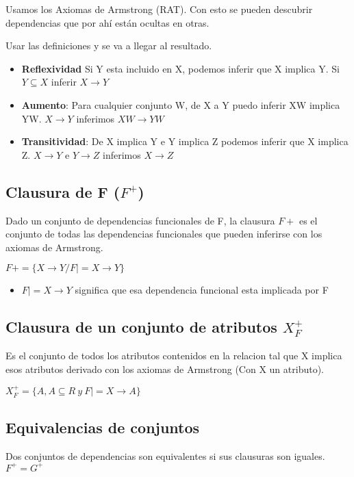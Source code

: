 Usamos los Axiomas de Armstrong (RAT). Con esto se pueden descubrir dependencias que por ahí están ocultas en otras.

\medskip
Usar las definiciones y se va a llegar al resultado.

\begin{itemize}
\item \textbf{Reflexividad} Si Y esta incluido en X, podemos inferir que X implica Y. Si $Y \subseteq X$ inferir $X\rightarrow Y$
\item \textbf{Aumento}: Para cualquier conjunto W, de X a Y puedo inferir XW implica YW. $X\rightarrow Y$ inferimos $XW\rightarrow YW$
\item \textbf{Transitividad}: De X implica Y e Y implica Z podemos inferir que X implica Z. $X\rightarrow Y$ e $Y\rightarrow Z$ inferimos $X\rightarrow Z$
\end{itemize}

\subsection*{Clausura de F ($F^+$)}
Dado un conjunto de dependencias funcionales de F, la clausura $F+$ es el conjunto de todas las dependencias funcionales que pueden inferirse con los axiomas de Armstrong.

\begin{center}
    $F+ = \{X\rightarrow Y / F|=X\rightarrow Y\}$
\end{center}

\begin{itemize}
\item $F|=X\rightarrow Y$ significa que esa dependencia funcional esta implicada por F
\end{itemize}

\subsection*{Clausura de un conjunto de atributos $X_F^+$}

Es el conjunto de todos los atributos contenidos en la relacion tal que X implica esos atributos derivado con los axiomas de Armstrong (Con X un atributo).

\begin{center}
    $X_F^+ = \{ A, A\subseteq R \ y \ F|=X\rightarrow A\}$
\end{center}

\subsection*{Equivalencias de conjuntos}
Dos conjuntos de dependencias son equivalentes si sus clausuras son iguales.
$F^+= G^+$

